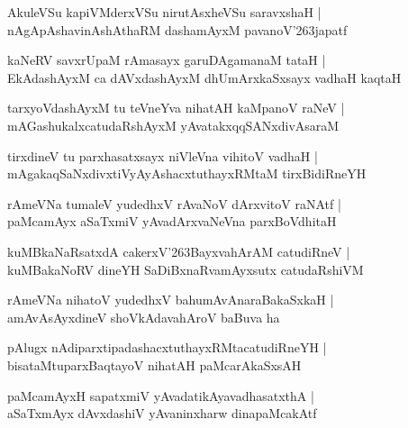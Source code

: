 \documentclass[twoside,12pt,openright]{book}
\def\S{\char'263}
\newcounter{shloka}[chapter]
\begin{document}
\begin{shloka}%
AkuleVSu kapiVMderxVSu nirutAsxheVSu saravxshaH |\\
nAgApAshavinAshAthaRM dashamAyxM pavanoV\S japatf
\end{shloka}

\begin{shloka}%
kaNeRV savxrUpaM rAmasayx garuDAgamanaM tataH |\\
EkAdashAyxM ca dAVxdashAyxM dhUmArxkaSxsayx vadhaH kaqtaH
\end{shloka}

\begin{shloka}%
tarxyoVdashAyxM tu teVneYva nihatAH kaMpanoV raNeV |\\
mAGashukalxcatudaRshAyxM yAvatakxqqSANxdivAsaraM 
\end{shloka}

\begin{shloka}%
tirxdineV tu parxhasatxsayx niVleVna vihitoV vadhaH |\\
mAgakaqSaNxdivxtiVyAyAshacxtuthayxRMtaM tirxBidiRneYH  
\end{shloka}

\begin{shloka}%
rAmeVNa tumaleV yudedhxV rAvaNoV dArxvitoV raNAtf |\\
paMcamAyx aSaTxmiV yAvadArxvaNeVna parxBoVdhitaH 
\end{shloka}

\begin{shloka}%
kuMBkaNaRsatxdA cakerxV\S BayxvahArAM catudiRneV |\\
kuMBakaNoRV dineYH SaDiBxnaRvamAyxsutx catudaRshiVM 
\end{shloka}

\begin{shloka}%
rAmeVNa nihatoV yudedhxV bahumAvAnaraBakaSxkaH |\\
amAvAsAyxdineV shoVkAdavahAroV baBuva ha 
\end{shloka}

\begin{shloka}%
pAlugx nAdiparxtipadashacxtuthayxRMtacatudiRneYH |\\
bisataMtuparxBaqtayoV nihatAH paMcarAkaSxsAH 
\end{shloka}

\begin{shloka}%
paMcamAyxH sapatxmiV yAvadatikAyavadhasatxthA |\\
aSaTxmAyx dAvxdashiV yAvaninxharw dinapaMcakAtf
\end{shloka}
\end{document}
